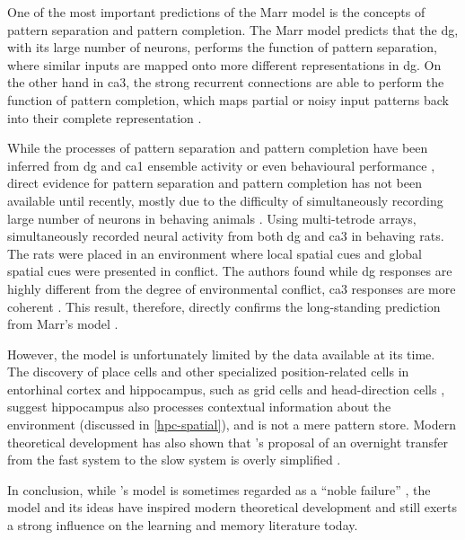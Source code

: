 One of the most important predictions of the Marr model \citep{marr71} is the concepts of pattern separation and pattern completion. The Marr model predicts that the \gls{dg}, with its large number of neurons, performs the function of pattern separation, where similar inputs are mapped onto more different representations in \gls{dg}. On the other hand in \gls{ca3}, the strong recurrent connections are able to perform the function of pattern completion, which maps partial or noisy input patterns back into their complete representation \citep{rolls13, knierim16}. 

While the processes of pattern separation and pattern completion have been inferred from \gls{dg} and \gls{ca1} ensemble activity or even behavioural performance \citep{santoro13, rolls13}, direct evidence for  pattern separation and pattern completion has not been available until recently, mostly due to the difficulty of simultaneously recording large number of neurons in behaving animals \citep{knierim16}. Using multi-tetrode arrays, \citet{neunuebel14} simultaneously recorded neural activity from both \gls{dg} and \gls{ca3} in behaving rats. The rats were placed in an environment where local spatial cues and global spatial cues were presented in conflict. The authors found while \gls{dg} responses are highly different from the degree of environmental conflict, \gls{ca3} responses are more coherent \citep{neunuebel14}. This result, therefore, directly confirms the long-standing prediction from Marr's model \citep{rolls13, knierim16}. 

However, the \citet{marr71} model is unfortunately limited by the data available at its time. The discovery of place cells \citep{o'keefe71} and other specialized position-related cells in entorhinal cortex and hippocampus, such as grid cells and head-direction cells \citep{taube90, fyhn04, hafting05}, suggest hippocampus also processes contextual information about the environment (discussed in \ref{hpc-spatial}), and is not a mere pattern store. Modern theoretical development has also shown that \citet{marr71}'s proposal of an overnight transfer from the fast system to the slow system is overly simplified \citep{squire09}. 

In conclusion, while \citet{marr71}'s model is sometimes regarded as a ``noble failure'' \citep{willshaw15}, the model and its ideas have inspired modern theoretical development and still exerts a strong influence on the learning and memory literature today. 


